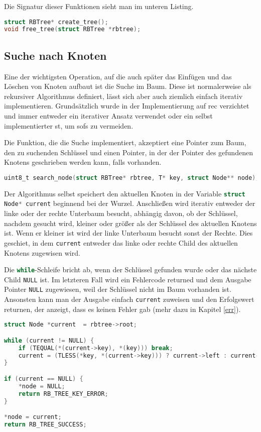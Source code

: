 \documentclass[11pt]{article}
\newcommand{\lstin}[1]{\lstinline[language=C]{#1}}
\begin{document}
Die Signatur dieser Funktionen sieht man im unteren Listing.

\begin{lstlisting}[language=C]
struct RBTree* create_tree();  
void free_tree(struct RBTree *rbtree);
\end{lstlisting}

\subsection{Suche nach Knoten}
Eine der wichtigsten Operation, auf die auch später das Einfügen und das Löschen von Knoten aufbaut ist die Suche im Baum. Diese ist normalerweise als rekursiver Algorithmus definiert, lässt sich aber auch ziemlich einfach iterativ implementieren.
Grundsätzlich wurde in der Implementierung auf \gls{rec} verzichtet und immer entweder ein iterativer Ansatz verwendet oder ein selbst implementierter \gls{st}, um \glspl{sof} zu vermeiden.

Die Funktion, die die Suche implementiert, akzeptiert eine Pointer zum Baum, den zu suchenden Schlüssel und einen Pointer, in der der Pointer des gefundenen Knotens geschrieben werden kann, falls vorhanden. 

\begin{lstlisting}[language=C]
uint8_t search_node(struct RBTree* rbtree, T* key, struct Node** node);
\end{lstlisting}

Der Algorithmus selbst speichert den aktuellen Knoten in der Variable \lstin{struct Node* current} beginnend bei der Wurzel. Anschließen wird iterativ entweder der linke oder der rechte Unterbaum besucht, abhängig davon, ob der Schlüssel, nachdem gesucht wird, kleiner oder größer als der Schlüssel des aktuellen Knotens ist.
Wenn er kleiner ist wird der linke Unterbaum besucht sonst der Rechte. Dies geschiet, in dem \lstin{current} entweder das linke oder rechte Child des aktuellen Knotens zugewisen wird.

Die \lstin{while}-Schleife bricht ab, wenn der Schlüssel gefunden wurde oder das nächste Child \lstin{NULL} ist. Im letzteren Fall wird ein Fehlercode returned und dem Ausgabe Pointer \lstin{NULL} zugewiesen, weil der Schlüssel nicht im Baum vorhanden ist. 
Ansonsten kann man der Ausgabe einfach \lstin{current} zuweisen und den Erfolgswert returnen, der anzeigt, dass es keinen Fehler gab (mehr dazu in Kapitel \ref{err}). 

\begin{lstlisting}[language=C]
struct Node *current  = rbtree->root;

while (current != NULL) {
    if (TEQUAL(*(current->key), *(key))) break;
    current = (TLESS(*key, *(current->key))) ? current->left : current->right;
}

if (current == NULL) {
    *node = NULL;
    return RB_TREE_KEY_ERROR;
}

*node = current;
return RB_TREE_SUCCESS;
\end{lstlisting}
\end{document}
